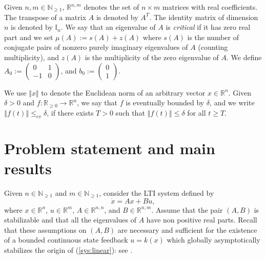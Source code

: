 \documentclass[letterpaper, 10pt]{article}
\newcommand{\identity}{\mathbb{I}}
\newcommand{\norme}[1]{\left\Vert #1\right\Vert}
\newcommand{\reels}{\mathbb{R}}
\begin{document}
Given $n,m\in\mathbb N_{\geq 1}$, $\reels^{n,m}$ denotes the set of $n\times m$ matrices with real coefficients. The transpose of a matrix $A$ is denoted by $A^T$. The identity matrix of dimension $n$ is denoted by $\identity_n$. We say that an eigenvalue of $A$ is {\it critical} if it has zero real part and we set $\mu(A):=s(A)+z(A)$ where $s(A)$ is the number of conjugate pairs of nonzero purely imaginary eigenvalues of $A$ (counting multiplicity), and $z(A)$ is the multiplicity of the zero eigenvalue of $A$. We define $A_0 := \begin{pmatrix}
0 & 1 \\
-1 & 0
\end{pmatrix}$, and $b_0 := \begin{pmatrix}
0\\
1 
\end{pmatrix}$. 

We use $\Vert x\Vert$ to denote the Euclidean  norm of an arbitrary vector $x\in\reels^n$. Given $\delta > 0$ and $f : \reels_{\geq 0} \rightarrow \reels^{n}$, we say that $f$ is eventually bounded by $\delta$, and we write $\norme{f(t)} \leq_{ev} \delta$, if there exists $T>0$ such that $\norme{f(t)} \leq \delta$ for all $t \geq T$.
\section{Problem statement and main results}\label{sec: main}


Given $n\in\mathbb N_{\geq 1}$ and $m\in\mathbb N_{\geq 1}$,  consider the LTI system defined by
\begin{equation}
\label{sys:linear}
\dot{x}= Ax +Bu,
\end{equation}
where $x \in \reels^n$, $u \in \reels^m$, $A\in \reels^{n,n}$, and $B\in \reels^{n,m}$. Assume that the pair $(A,B)$ is stabilizable and that all the eigenvalues of $A$ have non positive real parts. Recall that these assumptions on $(A,B)$ are necessary and sufficient for the existence of a bounded continuous state feedback $u=k(x)$ which globally asymptotically stabilizes the origin of (\ref{sys:linear}): see \cite{SSY}. 
\end{document}
